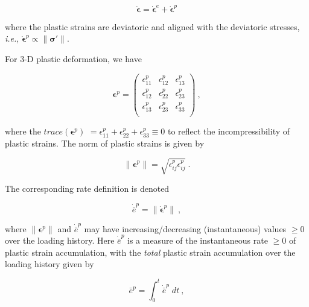 \documentclass[11pt]{report}
\numberwithin{equation}{section}
\newcommand{\bmf } {\boldsymbol }
\begin{document}
\begin{equation}
\bmf  {\dot \epsilon} = \bmf {\dot \epsilon}^e + \bmf {\dot\epsilon}^p
\end {equation}

\noindent where the plastic strains are deviatoric and aligned with
the deviatoric stresses, \textit{i.e.}, $\dot {\bmf {\epsilon}}^p
 \propto \parallel \bmf \sigma' \parallel $.

For 3-D plastic deformation, we have


\begin{equation}\label{E:epsplas_tensor}
\bmf \epsilon^p =
 \begin{pmatrix}
     \epsilon^p_{11} & \epsilon^p_{12} & \epsilon^p_{13} \\
     \epsilon^p_{12} & \epsilon^p_{22} & \epsilon^p_{23} \\
     \epsilon^p_{13} & \epsilon^p_{23} & \epsilon^p_{33} \\
 \end{pmatrix}~,
\end{equation}

\noindent where the $trace \left( \bmf \epsilon^p \right )$ 
$= \epsilon^p_{11} + \epsilon^p_{22}+\epsilon^p_{33}\equiv 0$ to reflect 
the incompressibility of plastic strains. The norm of plastic strains is given by

\begin{equation}\label{E:norm_epsilon_p_defined}
\parallel \bmf \epsilon^p \parallel = \sqrt{ \epsilon^p_{ij} \epsilon^p_{ij} }~.
\end{equation}

\noindent The corresponding rate definition is denoted

\begin{equation}\label{E:e_bar_p_rate_define}
\dot {\bar e}^p = \parallel \dot{\bmf \epsilon}^p \parallel ~,
\end{equation}

\noindent where $\parallel \bmf\epsilon^p \parallel$ and
 $\dot{\bar e}^p$ may have increasing/decreasing (instantaneous) values $\ge 0$ over the
loading history. Here $\dot {\bar e}^p$ is a measure of the instantaneous rate $\ge 0$ of
plastic strain accumulation, with the \textit{total} plastic strain accumulation over the
loading history given by

\begin{equation}\label{E:e_bar_p_define}
\bar e^p = \int^t_0 \dot {\bar e}^p\;dt~,
\end{equation}
\end{document}
